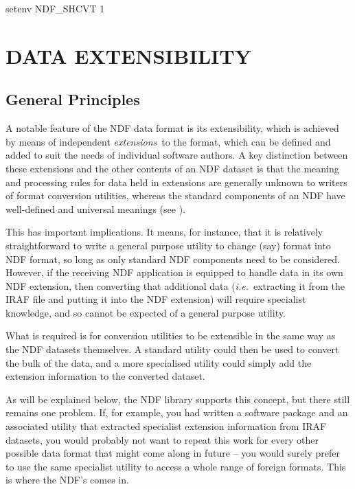 \documentclass[11pt,twoside,nolof]{starlink}
\providecommand{\st}[1]{{\em{#1}}}
\begin{document}
\begin{terminalv}
setenv NDF_SHCVT 1
\end{terminalv}

\section{DATA EXTENSIBILITY}

\subsection{General Principles}

A notable feature of the NDF data format is its extensibility, which
is achieved by means of independent
\st{extensions\footnotemark}\ to the format, which can be defined and added to suit the
needs of individual software authors.  A key distinction between these
extensions and the other contents of an NDF dataset is that the
meaning and processing rules for data held in extensions are generally
unknown to writers of format conversion utilities, whereas the
standard components of an NDF have well-defined and universal meanings
(see ).

This has important implications. It means, for instance, that it is
relatively straightforward to write a general purpose utility to
change (say)  format into NDF format, so long as
only standard NDF components need to be considered. However, if the
receiving NDF application is equipped to handle data in its own NDF
extension, then converting that additional data
(\st{i.e.}\ extracting it from the IRAF file and putting it into the
NDF extension) will require specialist knowledge, and so cannot be
expected of a general purpose utility.

What is required is for conversion utilities to be extensible in the
same way as the NDF datasets themselves. A standard utility could then
be used to convert the bulk of the data, and a more specialised
utility could simply add the extension information to the converted
dataset.

As will be explained below, the NDF library supports this concept, but
there still remains one problem. If, for example, you had written a
software package and an associated utility that extracted specialist
extension information from IRAF datasets, you would probably not want
to repeat this work for every other possible data format that might
come along in future -- you would surely prefer to use the same
specialist utility to access a whole range of foreign formats. This is
where the NDF's \htmlref{\st{FITS extension}}{sect:fitsextension}
comes in.
\end{document}
